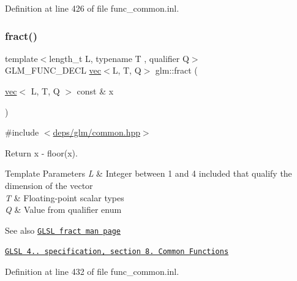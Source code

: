 Definition at line 426 of file func\+\_\+common.\+inl.

\mbox{\label{group__core__func__common_ga2df623004f634b440d61e018d62c751b}} 
\subsubsection{\texorpdfstring{fract()}{fract()}\hspace{0.1cm}{\footnotesize\ttfamily [2/2]}}
{\footnotesize\ttfamily template$<$length\+\_\+t L, typename T , qualifier Q$>$ \\
G\+L\+M\+\_\+\+F\+U\+N\+C\+\_\+\+D\+E\+CL \hyperlink{structglm_1_1vec}{vec}$<$L, T, Q$>$ glm\+::fract (\begin{DoxyParamCaption}\item[{\hyperlink{structglm_1_1vec}{vec}$<$ L, T, Q $>$ const \&}]{x }\end{DoxyParamCaption})}



{\ttfamily \#include $<$\hyperlink{common_8hpp}{deps/glm/common.\+hpp}$>$}

Return x -\/ floor(x).


\begin{DoxyTemplParams}{Template Parameters}
{\em L} & Integer between 1 and 4 included that qualify the dimension of the vector \\
\hline
{\em T} & Floating-\/point scalar types \\
\hline
{\em Q} & Value from qualifier enum\\
\hline
\end{DoxyTemplParams}
\begin{DoxySeeAlso}{See also}
\href{http://www.opengl.org/sdk/docs/manglsl/xhtml/fract.xml}{\tt G\+L\+SL fract man page} 

\href{http://www.opengl.org/registry/doc/GLSLangSpec.4.20.8.pdf}{\tt G\+L\+SL 4.. specification, section 8. Common Functions} 
\end{DoxySeeAlso}


Definition at line 432 of file func\+\_\+common.\+inl.

\mbox{\label{group__core__func__common_ga20620e83544d1a988857a3bc4ebe0e1d}} 
